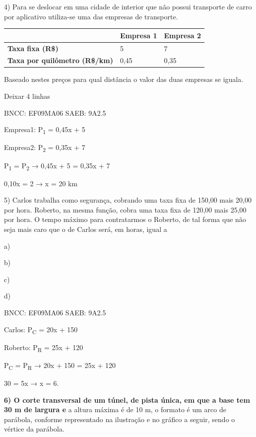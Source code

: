 \begin{escolha}
{{{\begin{escolha}
{{{4) Para se deslocar em uma cidade de interior que não possui transporte
de carro por aplicativo utiliza-se uma das empresas de transporte.

\begin{longtable}[]{@{}lll@{}}
\toprule\noalign{}
& \textbf{Empresa 1} & \textbf{Empresa 2} \\
\midrule\noalign{}
\endhead
\bottomrule\noalign{}
\endlastfoot
\textbf{Taxa fixa (R\$)} & 5 & 7 \\
\textbf{Taxa por quilômetro (R\$/km)} & 0,45 & 0,35 \\
\end{longtable}

Baseado nestes preços para qual distância o valor das duas empresas se
iguala.

Deixar 4 linhas

BNCC: EF09MA06 SAEB: 9A2.5

Empresa1: P\textsubscript{1} = 0,45x + 5

Empresa2: P\textsubscript{2} = 0,35x + 7

P\textsubscript{1} = P\textsubscript{2} → 0,45x + 5 = 0,35x + 7

0,10x = 2 → x = 20 km

5) Carlos trabalha como segurança, cobrando uma taxa fixa de 150,00 mais
20,00 por hora. Roberto, na mesma função, cobra uma taxa fixa de 120,00
mais 25,00 por hora. O tempo máximo para contratarmos o Roberto, de tal
forma que não seja mais caro que o de Carlos será, em horas, igual a

a)

b)

c)

d)

BNCC: EF09MA06 SAEB: 9A2.5

Carlos: P\textsubscript{C} = 20x + 150

Roberto: P\textsubscript{R} = 25x + 120

P\textsubscript{C} = P\textsubscript{R} → 20x + 150 = 25x + 120

30 = 5x → x = 6.

\textbf{6) O corte transversal de um túnel, de pista única, em que a
base tem 30 m de largura e} a altura máxima é de 10 m, o formato é um
arco de parábola, conforme representado na ilustração e no gráfico a
seguir, sendo o vértice da parábola.

}}}
\end{escolha}}}}
\end{escolha}
